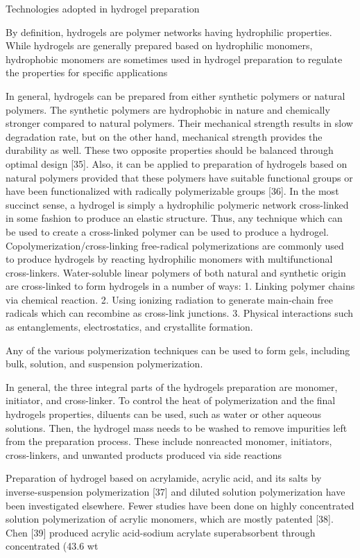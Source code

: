 \documentclass[../../main-notes.tex]{subfiles}
\begin{document}
Technologies adopted in hydrogel preparation

By definition, hydrogels are polymer networks having hydrophilic properties. 
While hydrogels are generally prepared based on hydrophilic monomers, hydrophobic monomers are sometimes used in hydrogel preparation to regulate the properties for specific applications

In general, hydrogels can be prepared from either synthetic polymers or natural polymers. 
The synthetic polymers are hydrophobic in nature and chemically stronger compared to natural polymers. 
Their mechanical strength results in slow degradation rate, but on the other hand, mechanical strength provides the durability as well. 
These two opposite properties should be balanced through optimal design [35]. 
Also, it can be applied to preparation of hydrogels based on natural polymers provided that these polymers have suitable functional groups or have been functionalized with radically polymerizable groups [36]. 
In the most succinct sense, a hydrogel is simply a hydrophilic polymeric network cross-linked in some fashion to produce an elastic structure. 
Thus, any technique which can be used to create a cross-linked polymer can be used to produce a hydrogel. 
Copolymerization/cross-linking free-radical polymerizations are commonly used to produce hydrogels by reacting hydrophilic monomers with multifunctional cross-linkers. 
Water-soluble linear polymers of both natural and synthetic origin are cross-linked to form hydrogels in a number of ways:
1. Linking polymer chains via chemical reaction. 
2. Using ionizing radiation to generate main-chain free radicals which can recombine as cross-link junctions. 
3. Physical interactions such as entanglements, electrostatics, and crystallite formation.

Any of the various polymerization techniques can be used to form gels, including bulk, solution, and suspension polymerization.

In general, the three integral parts of the hydrogels preparation are monomer, initiator, and cross-linker. 
To control the heat of polymerization and the final hydrogels properties, diluents can be used, such as water or other aqueous solutions. 
Then, the hydrogel mass needs to be washed to remove impurities left from the preparation process. 
These include nonreacted monomer, initiators, cross-linkers, and unwanted products produced via side reactions

Preparation of hydrogel based on acrylamide, acrylic acid, and its salts by inverse-suspension polymerization [37] and diluted solution polymerization have been investigated elsewhere. 
Fewer studies have been done on highly concentrated solution polymerization of acrylic monomers, which are mostly patented [38]. 
Chen [39] produced acrylic acid-sodium acrylate superabsorbent through concentrated (43.6 wt%
\end{document}
